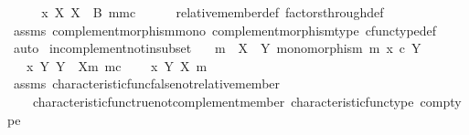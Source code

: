 \begin{isabellebody}
\ \ \isamarkupfalse%
\ \isamarkupfalse%
\ {\isachardoublequoteopen}x\ {\isasymin}\isactrlbsub X\isactrlesub \ {\isacharparenleft}{\kern0pt}X\ {\isasymsetminus}\ {\isacharparenleft}{\kern0pt}B{\isacharcomma}{\kern0pt}\ m{\isacharparenright}{\kern0pt}{\isacharcomma}{\kern0pt}m\isactrlsup c{\isacharparenright}{\kern0pt}{\isachardoublequoteclose}\isanewline
\ \ \ \ \isamarkupfalse%
\ relative{\isacharunderscore}{\kern0pt}member{\isacharunderscore}{\kern0pt}def\ factors{\isacharunderscore}{\kern0pt}through{\isacharunderscore}{\kern0pt}def\isanewline
\ \ \ \ \isamarkupfalse%
\ assms\ complement{\isacharunderscore}{\kern0pt}morphism{\isacharunderscore}{\kern0pt}mono\ complement{\isacharunderscore}{\kern0pt}morphism{\isacharunderscore}{\kern0pt}type\ cfunc{\isacharunderscore}{\kern0pt}type{\isacharunderscore}{\kern0pt}def\ \isamarkupfalse%
\ auto\isanewline
{}\isamarkupfalse%
%
\endisatagproof
{\isafoldproof}%
%
\isadelimproof
\isanewline
%
\endisadelimproof
\isanewline
{}\isamarkupfalse%
\ in{\isacharunderscore}{\kern0pt}complement{\isacharunderscore}{\kern0pt}not{\isacharunderscore}{\kern0pt}in{\isacharunderscore}{\kern0pt}subset{\isacharcolon}{\kern0pt}\isanewline
\ \ \ {\isachardoublequoteopen}m\ {\isacharcolon}{\kern0pt}\ X\ {\isasymrightarrow}\ Y{\isachardoublequoteclose}\ {\isachardoublequoteopen}monomorphism\ m{\isachardoublequoteclose}\ {\isachardoublequoteopen}x\ {\isasymin}\isactrlsub c\ Y{\isachardoublequoteclose}\isanewline
\ \ \ {\isachardoublequoteopen}x\ {\isasymin}\isactrlbsub Y\isactrlesub \ {\isacharparenleft}{\kern0pt}Y\ {\isasymsetminus}\ {\isacharparenleft}{\kern0pt}X{\isacharcomma}{\kern0pt}m{\isacharparenright}{\kern0pt}{\isacharcomma}{\kern0pt}\ m\isactrlsup c{\isacharparenright}{\kern0pt}{\isachardoublequoteclose}\isanewline
\ \ \ {\isachardoublequoteopen}{\isasymnot}\ x\ {\isasymin}\isactrlbsub Y\isactrlesub \ {\isacharparenleft}{\kern0pt}X{\isacharcomma}{\kern0pt}\ m{\isacharparenright}{\kern0pt}{\isachardoublequoteclose}\isanewline
%
\isadelimproof
\ \ %
\endisadelimproof
%
\isatagproof
{}\isamarkupfalse%
\ assms\ characteristic{\isacharunderscore}{\kern0pt}func{\isacharunderscore}{\kern0pt}false{\isacharunderscore}{\kern0pt}not{\isacharunderscore}{\kern0pt}relative{\isacharunderscore}{\kern0pt}member\isanewline
\ \ \ \ characteristic{\isacharunderscore}{\kern0pt}func{\isacharunderscore}{\kern0pt}true{\isacharunderscore}{\kern0pt}not{\isacharunderscore}{\kern0pt}complement{\isacharunderscore}{\kern0pt}member\ characteristic{\isacharunderscore}{\kern0pt}func{\isacharunderscore}{\kern0pt}type\ comp{\isacharunderscore}{\kern0pt}type\isanewline

\end{isabellebody}
